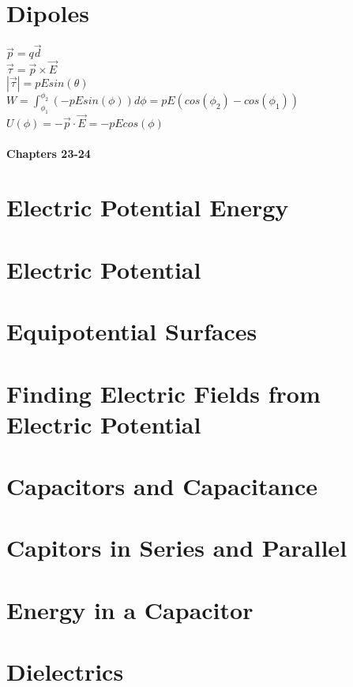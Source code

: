 \documentclass[10pt, a4paper, twocolumn]{article}
\begin{document}
    \section{Dipoles}    
    $\vec{p} = q \vec{d}$\\
    $\vec{\tau} = \vec{p} \times \vec{E}$\\
    $|\vec{\tau}| = pEsin(\theta)$\\
    $W = \int^{\phi_2}_{\phi_1} (-pEsin(\phi))d\phi = pE(cos(\phi_2) - cos(\phi_1))$
    $U(\phi) = -\vec{p} \cdot \vec{E} = -pEcos(\phi)$\\ \\

\textbf{\huge Chapters 23-24}
    \section{Electric Potential Energy}	
    \section{Electric Potential}	
    \section{Equipotential Surfaces}	
    \section{Finding Electric Fields from Electric Potential}	
    \section{Capacitors and Capacitance}	
    \section{Capitors in Series and Parallel}	
    \section{Energy in a Capacitor}	
    \section{Dielectrics}	
\end{document}
